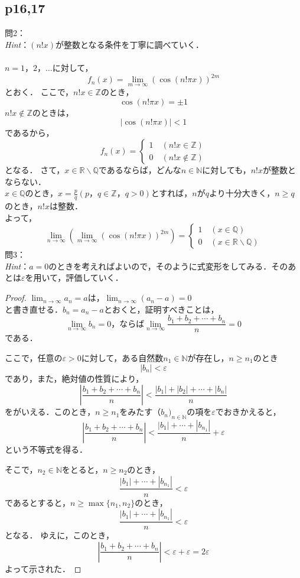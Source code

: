 \documentclass[dvipdfmx,uplatex,11pt]{jsarticle}
\theoremstyle{definition}
\begin{document}
\subsection{p16,17}
%
\noindent
問2：
\\
\textsl{Hint}：$(n!x)$が整数となる条件を丁寧に調べていく．\\
\dotfill
%
% 
%
\\
$n=1，2，\ldots$に対して，
\[
	f_{n} (x)=\lim_{m \to \infty} (\cos (n! \pi x)) ^{2m}
\]
とおく．
ここで，$n!x \in \mathbb{Z}$のとき，
\[
	\cos (n! \pi x)=\pm 1
\]
$n!x \notin \mathbb{Z}$のときは，
\[
	|\cos (n! \pi x)|<1
\]
であるから，
\[
	f_{n} (x)=
	\begin{cases}
		1 \quad(n!x \in \mathbb{Z}) \\
		0 \quad (n!x \notin \mathbb{Z})
	\end{cases}
\]
となる．
さて，$x \in \mathbb{R} \backslash\mathbb{Q}$であるならば，どんな$n \in \mathbb{N}$に対しても，$n! x$が整数とならない．\\
$x \in \mathbb{Q}$のとき，$ x=\frac{p}{q}(p，q \in \mathbb{Z}，q>0)$とすれば，$n$が$q$より十分大きく，$n \ge q$のとき，$n!x$は整数．\\
よって，
\[
	\lim_{n \to \infty} \left( \lim_{m \to \infty} (\cos (n! \pi x)) ^{2m} \right)=
	\begin{cases}
		1 \quad (x \in \mathbb{Q}) \\
		0  \quad (x \in \mathbb{R} \backslash \mathbb{Q})
	\end{cases}
\]
%
\newpage
%
\noindent
問3：
\\
\textsl{Hint}：$a=0$のときを考えればよいので，そのように式変形をしてみる．そのあとは$\varepsilon$を用いて，評価していく．\\
\dotfill
%
\begin{leftbar}
	\begin{proof}
		$\lim_{n \to \infty} a_n= a$は，$ \lim_{n \to \infty} (a_n - a)= 0$\\
		と書き直せる．$b_n = a_n -a$とおくと，証明すべきことは，
		\[
			\lim_{n \to \infty} b_n=0，ならば \lim_{n \to \infty} \frac{b_1 + b_2 + \cdots +b_n}{n} = 0
		\]
		である．\par
		ここで，任意の$\varepsilon > 0$に対して，ある自然数$n_1 \in \mathbb{N}$が存在し，$n \ge n_1$のとき
		\[
			|b_n|<\varepsilon
		\]
		であり，また，絶対値の性質により，
		\[
			\left| \frac{b_1 + b_2 + \cdots +b_n}{n} \right| <\frac{|b_1| + |b_2| + \cdots +|b_n|}{n}
		\]
		をがいえる．このとき，$n \ge n_1$をみたす$（b_n)_{n \in \mathbb{N}}$の項を$\varepsilon$でおきかえると，
		\[
			\left| \frac{b_1 + b_2 + \cdots +b_n}{n} \right| < \frac{|b_1|+ \cdots + |b_{n_1}|}{n} +\varepsilon
		\]
		という不等式を得る．\par
		そこで，$n_2 \in \mathbb{N}$をとると，$n \ge n_2$のとき，
		\[
			\frac{|b_1|+ \cdots + |b_{n_1}|}{n} <\varepsilon
		\]
		であるとすると，$n \ge \max \{ n_1,n_2\}$のとき，
		\[
			\frac{|b_1|+ \cdots + |b_{n_1}|}{n} < \varepsilon
		\]
		となる．
		ゆえに，このとき，
		\[
			\left| \frac{ b_1 + b_2 + \cdots +b_n}{n} \right|　< \varepsilon+\varepsilon=2\varepsilon
		\]
		よって示された．
	\end{proof}
\end{leftbar}
\end{document}
